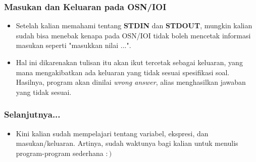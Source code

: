 \begin{frame}
\frametitle{Masukan dan Keluaran pada OSN/IOI}
\begin{itemize}
  \item Setelah kalian memahami tentang \textbf{STDIN} dan \textbf{STDOUT}, mungkin kalian sudah bisa menebak kenapa pada OSN/IOI tidak boleh mencetak informasi masukan seperti "masukkan nilai ...".
  \item Hal ini dikarenakan tulisan itu akan ikut tercetak sebagai keluaran, yang mana mengakibatkan ada keluaran yang tidak sesuai spesifikasi soal. Hasilnya, program akan dinilai \alert{\textit{wrong answer}}, alias menghasilkan jawaban yang tidak sesuai.
\end{itemize}
\end{frame}

\begin{frame}
\frametitle{Selanjutnya...}
\begin{itemize}
  \item Kini kalian sudah mempelajari tentang variabel, ekspresi, dan masukan/keluaran. Artinya, sudah waktunya bagi kalian untuk menulis program-program sederhana $:)$
\end{itemize}
\end{frame}


